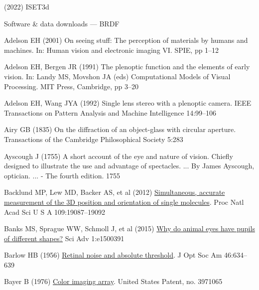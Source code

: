 \documentclass[
  letterpaper,
]{book}
\newlength{\cslhangindent}
\newenvironment{CSLReferences}[2] %
 {\begin{list}{}{%
  \setlength{\itemindent}{0pt}
  \setlength{\leftmargin}{0pt}
  \setlength{\parsep}{0pt}
  \ifodd #1
   \setlength{\leftmargin}{\cslhangindent}
   \setlength{\itemindent}{-1\cslhangindent}
  \fi
  \setlength{\itemsep}{#2\baselineskip}}}
 {\end{list}}
\begin{document}
\begin{CSLReferences}{1}{1}
(2022) {ISET3d}

Software \& data downloads --- {BRDF}

Adelson EH (2001) On seeing stuff: {The} perception of materials by
humans and machines. In: Human vision and electronic imaging {VI}. SPIE,
pp 1--12

Adelson EH, Bergen JR (1991) The plenoptic function and the elements of
early vision. In: Landy MS, Movshon JA (eds) Computational {Models} of
{Visual Processing}. MIT Press, Cambridge, pp 3--20

Adelson EH, Wang JYA (1992) Single lens stereo with a plenoptic camera.
IEEE Transactions on Pattern Analysis and Machine Intelligence
14:99--106

Airy GB (1835) On the diffraction of an object-glass with circular
aperture. Transactions of the Cambridge Philosophical Society 5:283

Ayscough J (1755) {A short account of the eye and nature of vision.
Chiefly designed to illustrate the use and advantage of spectacles. ...
By James Ayscough, optician. ... - The fourth edition. 1755}

Backlund MP, Lew MD, Backer AS, et al (2012)
\href{http://dx.doi.org/10.1073/pnas.1216687109}{Simultaneous, accurate
measurement of the {3D} position and orientation of single molecules}.
Proc Natl Acad Sci U S A 109:19087--19092

Banks MS, Sprague WW, Schmoll J, et al (2015)
\href{http://dx.doi.org/10.1126/sciadv.1500391}{Why do animal eyes have
pupils of different shapes?} Sci Adv 1:e1500391

Barlow HB (1956) \href{http://dx.doi.org/10.1364/JOSA.46.000634}{Retinal
noise and absolute threshold}. J Opt Soc Am 46:634--639

Bayer B (1976)
\href{https://cir.nii.ac.jp/crid/1572261550680217344}{Color imaging
array}. United States Patent, no. 3971065


\end{CSLReferences}
\end{document}
